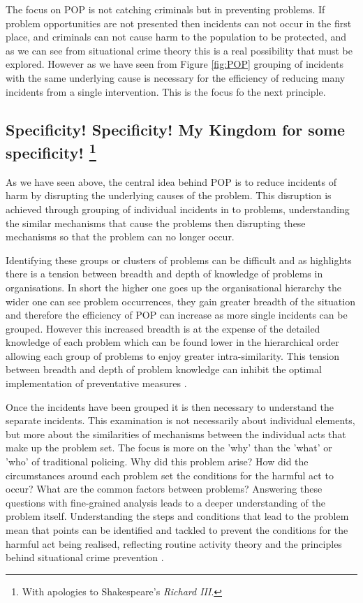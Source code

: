 The focus on POP is not catching criminals  but in preventing problems. If problem opportunities are not presented then incidents can not occur in the first place, and criminals can not cause harm to the population to be protected, and as we can see from situational crime theory this is a real possibility that must be explored. However as we have seen from Figure \ref{fig:POP} grouping of incidents with the same underlying cause is necessary for the efficiency of reducing many incidents from a single intervention. This is the focus fo the next principle. 

 
 
 \subsection[Specificity! Specificity! My Kingdom for some specificity! ]{Specificity! Specificity! My Kingdom for some specificity! \footnote{With apologies to Shakespeare’s \emph{Richard III}.} }


As we have seen above, the central idea behind POP is to reduce incidents of harm by disrupting the underlying causes of the problem. This disruption is achieved through grouping of individual incidents in to problems, understanding the similar mechanisms that cause the problems then disrupting these mechanisms so that the problem can no longer occur. 

Identifying these groups or clusters of problems can be difficult and as \textcite{scott2012implementing} highlights there is a tension between breadth and depth of knowledge of problems in organisations. In short the higher one goes up the organisational hierarchy the wider one can see problem occurrences, they gain greater breadth of the situation and therefore the efficiency of POP can increase as more single incidents can be grouped. However this increased breadth is at the expense of the detailed knowledge of each problem which can be found lower in the hierarchical order allowing each group of problems to enjoy greater intra-similarity. This tension between breadth and depth of problem knowledge can inhibit the optimal implementation of preventative measures \parencite{maguire2015problem}.

Once the incidents have been grouped it is then necessary to understand the separate incidents. This examination is not necessarily about individual elements, but more about the similarities of mechanisms between the individual acts that make up the problem set. The focus is more on the 'why' than the 'what' or 'who' of traditional policing. Why did this problem arise? How did the circumstances around each problem set the conditions for the harmful act to occur? What are the common factors between problems? Answering these questions with fine-grained analysis leads to a deeper understanding of the problem itself. Understanding the steps and conditions that lead to the problem mean that points can be identified and tackled to prevent the conditions for the harmful act being realised, reflecting routine activity theory and the principles behind situational crime prevention \parencite{felson1998opportunity}.

